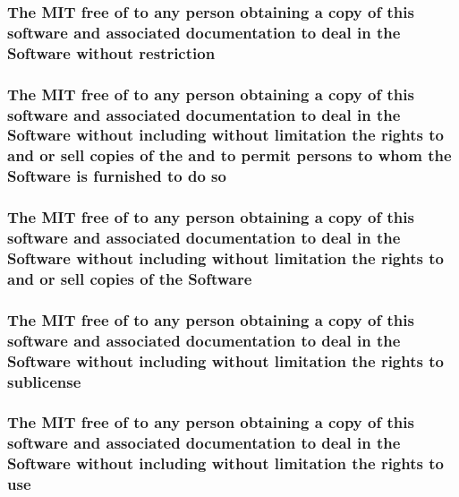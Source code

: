 \subsubsection[{restriction}]{\setlength{\rightskip}{0pt plus 5cm}The M\+I\+T free of to any person obtaining a {\bf copy} of this software and associated documentation to deal in the {\bf Software} without restriction}\label{license_8txt_ac0e1e4a858a6a19c5392f7f6d29f969c}
\hypertarget{license_8txt_ab05c0f0392781fce452b91e1ede41d90}{}
\subsubsection[{so}]{\setlength{\rightskip}{0pt plus 5cm}The M\+I\+T free of to any person obtaining a {\bf copy} of this software and associated documentation to deal in the {\bf Software} without including without limitation the rights to and or sell copies of the and to permit persons to whom the {\bf Software} is furnished to do so}\label{license_8txt_ab05c0f0392781fce452b91e1ede41d90}
\hypertarget{license_8txt_a22a1529885b3e9d66b0c72fe604fc3dc}{}
\subsubsection[{Software}]{\setlength{\rightskip}{0pt plus 5cm}The M\+I\+T free of to any person obtaining a {\bf copy} of this software and associated documentation to deal in the Software without including without limitation the rights to and or sell copies of the Software}\label{license_8txt_a22a1529885b3e9d66b0c72fe604fc3dc}
\hypertarget{license_8txt_af9fad5470a0b4e968d19b11b7c643fdb}{}
\subsubsection[{sublicense}]{\setlength{\rightskip}{0pt plus 5cm}The M\+I\+T free of to any person obtaining a {\bf copy} of this software and associated documentation to deal in the {\bf Software} without including without limitation the rights to sublicense}\label{license_8txt_af9fad5470a0b4e968d19b11b7c643fdb}
\hypertarget{license_8txt_ab8202310c90e99c59d9ea1f58f920a91}{}
\subsubsection[{use}]{\setlength{\rightskip}{0pt plus 5cm}The M\+I\+T free of to any person obtaining a {\bf copy} of this software and associated documentation to deal in the {\bf Software} without including without limitation the rights to use}\label{license_8txt_ab8202310c90e99c59d9ea1f58f920a91}
